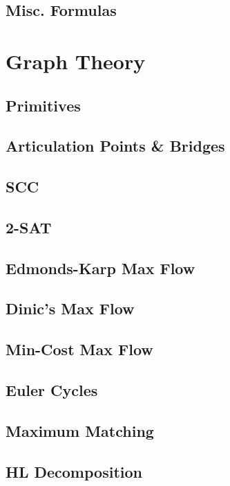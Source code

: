 \documentclass[twocolumn]{article}
\begin{document}
		\subsection{Misc. Formulas}
			
	\section{Graph Theory}
		\subsection{Primitives}
			
		\subsection{Articulation Points \& Bridges}
			
		\subsection{SCC}
			
		\subsection{2-SAT}
			
		\subsection{Edmonds-Karp Max Flow}
			
		\subsection{Dinic's Max Flow}
			
		\subsection{Min-Cost Max Flow}
			
		\subsection{Euler Cycles}
			
		\subsection{Maximum Matching}
			
		\subsection{HL Decomposition}
			
\end{document}

